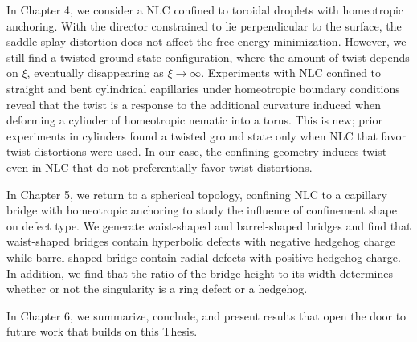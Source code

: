 In Chapter 4, we consider a NLC confined to toroidal droplets with homeotropic anchoring.
With the director constrained to lie perpendicular to the surface, the saddle-splay distortion does not affect the free energy minimization.
However, we still find a twisted ground-state configuration, where the amount of twist depends on $\xi$, eventually disappearing as $\xi \rightarrow \infty$.
Experiments with NLC confined to straight and bent cylindrical capillaries under homeotropic boundary conditions reveal that the twist is a response to the additional curvature induced when deforming a cylinder of homeotropic nematic into a torus.
This is new; prior experiments in cylinders found a twisted ground state only when NLC that favor twist distortions were used.
In our case, the confining geometry induces twist even in NLC that do not preferentially favor twist distortions.

In Chapter 5, we return to a spherical topology, confining NLC to a capillary bridge with homeotropic anchoring to study the influence of confinement shape on defect type.
We generate waist-shaped and barrel-shaped bridges and find that waist-shaped bridges contain hyperbolic defects with negative hedgehog charge while barrel-shaped bridge contain radial defects with positive hedgehog charge.
In addition, we find that the ratio of the bridge height to its width determines whether or not the singularity is a ring defect or a hedgehog.

In Chapter 6, we summarize, conclude, and present results that open the door to future work that builds on this Thesis.
